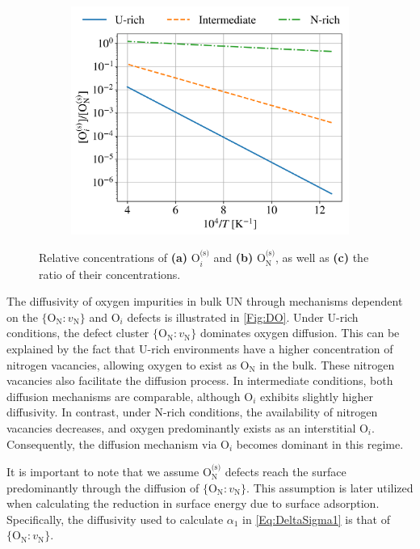 \documentclass[preprint,12pt,sort&compress]{elsarticle}
\newcommand{\?}{\stackrel{?}{=}}
\begin{document}
\begin{figure}[h!]
\begin{subfigure}{0.48\textwidth}
    \includegraphics[width=\textwidth]{Ois_ONs.png}
    \caption{}
    \label{Fig:Ois_ONs}
\end{subfigure}
\caption{Relative concentrations of \textbf{(a)} $\text{O}_i^\text{(s)}$ and \textbf{(b)} $\text{O}_\text{N}^\text{(s)}$, as well as \textbf{(c)} the ratio of their concentrations.}
\label{3}
\end{figure}

The diffusivity of oxygen impurities in bulk UN through mechanisms dependent on the $\{\text{O}_\text{N} \! : \! v_\text{N}\}$ and $\text{O}_i$ defects is illustrated in \cref{Fig:DO}. Under U-rich conditions, the defect cluster $ \{\text{O}_\text{N} \! : \! v_\text{N}\} $ dominates oxygen diffusion. This can be explained by the fact that U-rich environments have a higher concentration of nitrogen vacancies, allowing oxygen to exist as $ \text{O}_\text{N} $ in the bulk. These nitrogen vacancies also facilitate the diffusion process. In intermediate conditions, both diffusion mechanisms are comparable, although $ \text{O}_i $ exhibits slightly higher diffusivity. In contrast, under N-rich conditions, the availability of nitrogen vacancies decreases, and oxygen predominantly exists as an interstitial $ \text{O}_i $. Consequently, the diffusion mechanism via $ \text{O}_i $ becomes dominant in this regime.

It is important to note that we assume $ \text{O}_\text{N}^\text{(s)} $ defects reach the surface predominantly through the diffusion of $ \{\text{O}_\text{N} \! : \! v_\text{N}\} $. This assumption is later utilized when calculating the reduction in surface energy due to surface adsorption. Specifically, the diffusivity used to calculate $\alpha_1$ in \cref{Eq:DeltaSigma1} is that of $ \{\text{O}_\text{N} \! : \! v_\text{N}\} $.
\end{document}
